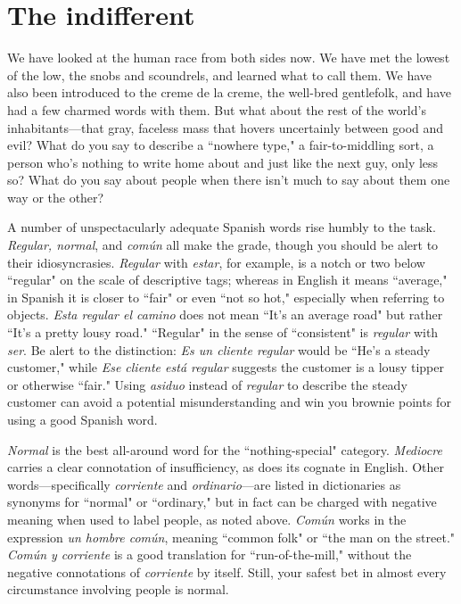 \section{The indifferent}

We have looked at the human race from both sides now. We
have met the lowest of the low, the snobs and scoundrels, and learned
what to call them. We have also been introduced to the creme de la
creme, the well-bred gentlefolk, and have had a few charmed words
with them. But what about the rest of the world's inhabitants---that
gray, faceless mass that hovers uncertainly between good and evil?
What do you say to describe a ``nowhere type," a fair-to-middling sort,
a person who's nothing to write home about and just like the next guy,
only less so? What do you say about people when there isn't much to
say about them one way or the other?

A number of unspectacularly adequate Spanish words rise
humbly to the task. \emph{Regular, normal}, and \emph{común} all make the grade,
though you should be alert to their idiosyncrasies. \emph{Regular} with \emph{estar},
for example, is a notch or two below ``regular" on the scale of descriptive tags; whereas in English it means ``average," in Spanish it is closer
to ``fair" or even ``not so hot," especially when referring to objects.
\emph{Esta regular el camino} does not mean ``It's an average road" but rather
``It's a pretty lousy road." ``Regular" in the sense of ``consistent" is
\emph{regular} with \emph{ser}. Be alert to the distinction: \emph{Es un cliente regular}
would be ``He's a steady customer," while \emph{Ese cliente está regular} suggests the customer is a lousy tipper or otherwise ``fair." Using \emph{asiduo}
instead of \emph{regular} to describe the steady customer can avoid a potential
misunderstanding and win you brownie points for using a good Spanish word.

\emph{Normal} is the best all-around word for the ``nothing-special"
category. \emph{Mediocre} carries a clear connotation of insufficiency, as does
its cognate in English. Other words---specifically \emph{corriente} and \emph{ordinario}---are listed in dictionaries as synonyms for ``normal" or ``ordinary,"
but in fact can be charged with negative meaning when used to label
people, as noted above. \emph{Común} works in the expression \emph{un hombre común}, meaning ``common folk" or ``the man on the street." \emph{Común y
corriente} is a good translation for ``run-of-the-mill," without the negative connotations of \emph{corriente} by itself. Still, your safest bet in almost
every circumstance involving people is normal.

